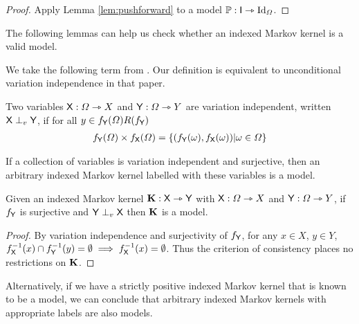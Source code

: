 \begin{proof}
Apply Lemma \ref{lem:pushforward} to a model $\mathbb{P}:\mathsf{I}\rightarrowtriangle\text{Id}_{\Omega}$.
\end{proof}

The following lemmas can help us check whether an indexed Markov kernel is a valid model.



We take the following term from \citet{constantinou_extended_2017}. Our definition is equivalent to unconditional variation independence in that paper.

\begin{definition}
Two variables $\mathsf{X}:\Omega\rightarrowtriangle X$ and $\mathsf{Y}:\Omega\rightarrowtriangle Y$ are variation independent, written $\mathsf{X}\perp_v \mathsf{Y}$, if for all $y\in f_{\mathsf{Y}}(\Omega)R(f_{\mathsf{Y}})$
\begin{align}
 f_{\mathsf{Y}}(\Omega) \times f_{\mathsf{X}}(\Omega) = \{(f_{\mathsf{Y}}(\omega),f_{\mathsf{X}}(\omega))|\omega\in \Omega\}
\end{align}
\end{definition}

If a collection of variables is variation independent and surjective, then an arbitrary indexed Markov kernel labelled with these variables is a model.

\begin{lemma}\label{lem:var_indep}
Given an indexed Markov kernel $\mathbf{K}:\mathsf{X} \rightarrowtriangle \mathsf{Y}$ with $\mathsf{X}:\Omega\rightarrowtriangle X$ and $\mathsf{Y}:\Omega\rightarrowtriangle Y$, if $f_{\mathsf{Y}}$ is surjective and $\mathsf{Y}\perp_v \mathsf{X}$ then $\mathbf{K}$ is a model.
\end{lemma}

\begin{proof}
By variation independence and surjectivity of $f_{\mathsf{Y}}$, for any $x\in X$, $y\in Y$, $f_{\mathsf{X}}^{-1}(x)\cap f_{\mathsf{Y}}^{-1}(y) = \emptyset \implies f_{\mathsf{X}}^{-1}(x) = \emptyset$. Thus the criterion of consistency places no restrictions on $\mathbf{K}$.
\end{proof}


Alternatively, if we have a strictly positive indexed Markov kernel that is known to be a model, we can conclude that arbitrary indexed Markov kernels with appropriate labels are also models.

